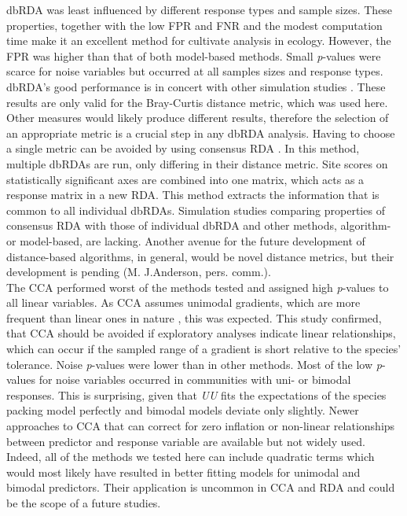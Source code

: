 \documentclass[a4paper,11pt]{article}
\begin{document}
    dbRDA was least influenced by different response types and sample sizes. 
    These properties, together with the low FPR and FNR and the modest computation time make it an excellent method for cultivate analysis in ecology.
	However, the FPR was higher than that of both model-based methods.
	Small \textit{p}-values were scarce for noise variables but occurred at all samples sizes and response types. 
	dbRDA's good performance is in concert with other simulation studies \citep[e.g.][]{Roberts2009}.
	These results are only valid for the Bray-Curtis distance metric, which was used here.
	Other measures would likely produce different results, 
	therefore the selection of an appropriate metric is a crucial step in any dbRDA analysis.
	Having to choose a single metric can be avoided by using consensus RDA \citep{Blanchet2014}.
	In this method, multiple dbRDAs are run, only differing in their distance metric. 
	Site scores on statistically significant axes are combined into one matrix, which acts as a response matrix in a new RDA. 
	This method extracts the information that is common to all individual dbRDAs.
	Simulation studies comparing properties of consensus RDA with those of individual dbRDA and other methods, algorithm- or model-based, are lacking.
	Another avenue for the future development of distance-based algorithms, in general, would be novel distance metrics, but their development is pending (M. J.Anderson, pers. comm.).\\


	The CCA performed worst of the methods tested and assigned high \textit{p}-values to all linear variables.
	As CCA assumes unimodal gradients, which are more frequent than linear ones in nature \citep{Oksanen2002}, this was expected.  
	This study confirmed, that CCA should be avoided if exploratory analyses indicate linear relationships, which can occur if the sampled range of a gradient is short relative to the species' tolerance. 
	Noise \textit{p}-values were lower than in other methods.
	Most of the low \textit{p}-values for noise variables occurred in communities with uni- or bimodal responses. 
	This is surprising, given that \textit{UU} fits the expectations of the species packing model perfectly and bimodal models deviate only slightly.
	Newer approaches to CCA that can correct for zero inflation \citep{Zhang2012} or non-linear relationships between predictor and response variable \citep{Makarenkov2002} are available but not widely used. 
	Indeed, all of the methods we tested here can include quadratic terms which would most likely have resulted in better fitting models for unimodal and bimodal predictors. 
	Their application is uncommon in CCA and RDA and could be the scope of a future studies.
\end{document}
